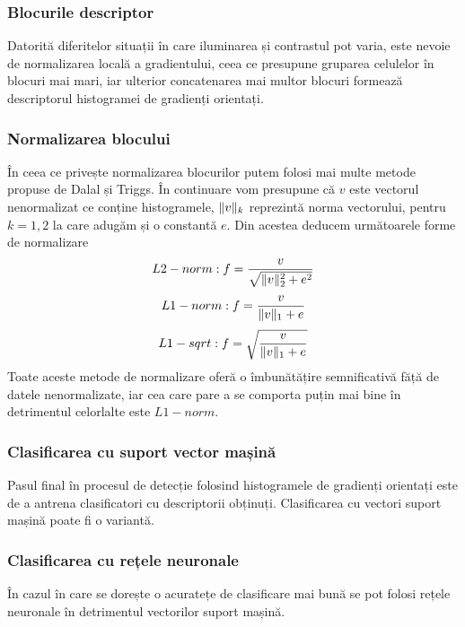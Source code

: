 \subsubsection {Blocurile descriptor}

Datorită diferitelor situații în care iluminarea și contrastul pot varia, este nevoie de normalizarea locală a gradientului, ceea ce presupune gruparea celulelor în blocuri mai mari, iar ulterior concatenarea mai multor blocuri formează descriptorul histogramei de gradienți orientați.

\subsubsection {Normalizarea blocului}

În ceea ce privește normalizarea blocurilor putem folosi mai multe metode propuse de Dalal și Triggs. În continuare vom presupune că $v$ este vectorul nenormalizat ce conține histogramele, $\lVert v\rVert_k$ reprezintă norma vectorului, pentru $k = 1,2$ la care adugăm și o constantă $e$. Din acestea deducem următoarele forme de normalizare
\begin{align}	
	L2-norm: f = \frac{v}{\sqrt{\lVert v\rVert_2^2 + e^2}}
\end{align}
\begin{align}	
	L1-norm: f = \frac{v}{\lVert v\rVert_1 + e}
\end{align}
\begin{align}	
	L1-sqrt: f = \sqrt{\frac{v}{\lVert v\rVert_1 + e}}
\end{align}
Toate aceste metode de normalizare oferă o îmbunătățire semnificativă făță de datele nenormalizate, iar cea care pare a se comporta puțin mai bine în detrimentul celorlalte este $L1-norm$.

\subsubsection {Clasificarea cu suport vector mașină}

Pasul final în procesul de detecție folosind histogramele de gradienți orientați este de a antrena clasificatori cu descriptorii obținuți. Clasificarea cu vectori suport mașină poate fi o variantă.

\subsubsection {Clasificarea cu rețele neuronale}

În cazul în care se dorește o acuratețe de clasificare mai bună se pot folosi rețele neuronale în detrimentul vectorilor suport mașină.

